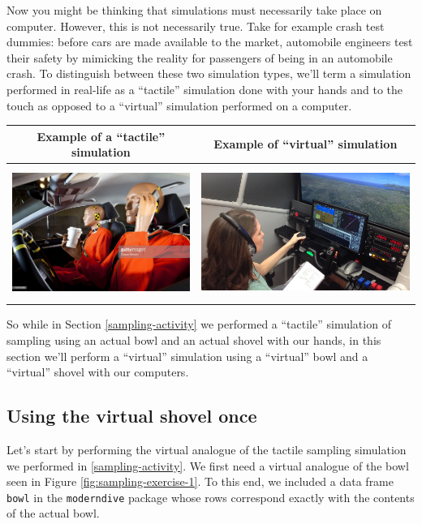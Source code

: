 \documentclass[12pt, krantz2,]{krantz}
\begin{document}
Now you might be thinking that simulations must necessarily take place on computer. However, this is not necessarily true. Take for example crash test dummies: before cars are made available to the market, automobile engineers test their safety by mimicking the reality for passengers of being in an automobile crash. To distinguish between these two simulation types, we'll term a simulation performed in real-life as a ``tactile'' simulation done with your hands and to the touch as opposed to a ``virtual'' simulation performed on a computer.

\begin{longtable}[]{@{}cc@{}}
\toprule
Example of a ``tactile'' simulation & Example of ``virtual'' simulation\tabularnewline
\midrule
\endhead
\includegraphics[width=\textwidth,height=1.7in]{images/crash-test-dummy.jpg} & \includegraphics[width=\textwidth,height=1.7in]{images/flight-simulator.jpg}\tabularnewline
\bottomrule
\end{longtable}

So while in Section \ref{sampling-activity} we performed a ``tactile'' simulation of sampling using an actual bowl and an actual shovel with our hands, in this section we'll perform a ``virtual'' simulation using a ``virtual'' bowl and a ``virtual'' shovel with our computers.

\hypertarget{using-the-virtual-shovel-once}{%
\subsection{Using the virtual shovel once}\label{using-the-virtual-shovel-once}}

Let's start by performing the virtual analogue of the tactile sampling simulation we performed in \ref{sampling-activity}. We first need a virtual analogue of the bowl seen in Figure \ref{fig:sampling-exercise-1}. To this end, we included a data frame \texttt{bowl} in the \texttt{moderndive} package whose rows correspond exactly with the contents of the actual bowl.
\end{document}
